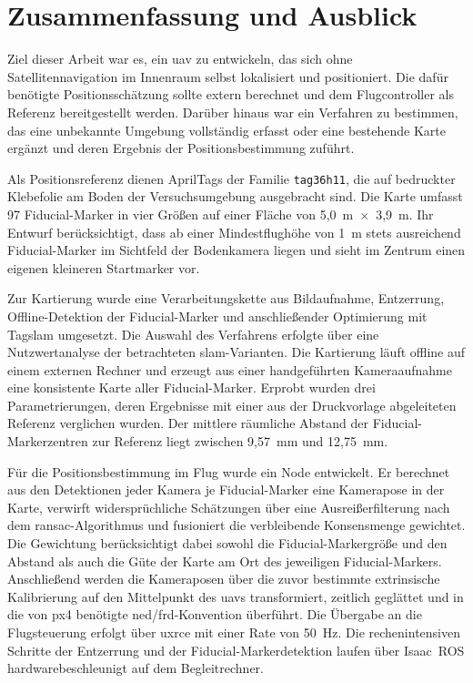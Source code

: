 
\chapter{Zusammenfassung und Ausblick}
\label{cap:zusammenfassung}
Ziel dieser Arbeit war es, ein \gls{uav} zu entwickeln, das sich ohne Satellitennavigation im Innenraum selbst lokalisiert und positioniert.
Die dafür benötigte Positionsschätzung sollte extern berechnet und dem Flugcontroller als Referenz bereitgestellt werden.
Darüber hinaus war ein Verfahren zu bestimmen, das eine unbekannte Umgebung vollständig erfasst oder eine bestehende Karte 
ergänzt und deren Ergebnis der Positionsbestimmung zuführt.

Als Positionsreferenz dienen AprilTags der Familie \texttt{tag36h11}, die auf bedruckter Klebefolie am Boden der Versuchsumgebung ausgebracht sind.
Die Karte umfasst 97 Fiducial-Marker in vier Größen auf einer Fläche von 5,0~m~$\times$~3,9~m.
Ihr Entwurf berücksichtigt, dass ab einer Mindestflughöhe von 1~m stets ausreichend Fiducial-Marker im Sichtfeld der Bodenkamera liegen 
und sieht im Zentrum einen eigenen kleineren Startmarker vor.

Zur Kartierung wurde eine Verarbeitungskette aus Bildaufnahme, Entzerrung, Offline-Detektion der Fiducial-Marker und anschließender Optimierung mit Tag\gls{slam} umgesetzt.
Die Auswahl des Verfahrens erfolgte über eine Nutzwertanalyse der betrachteten \gls{slam}-Varianten.
Die Kartierung läuft offline auf einem externen Rechner und erzeugt aus einer handgeführten Kameraaufnahme eine konsistente Karte aller Fiducial-Marker.
Erprobt wurden drei Parametrierungen, deren Ergebnisse mit einer aus der Druckvorlage abgeleiteten Referenz verglichen wurden.
Der mittlere räumliche Abstand der Fiducial-Markerzentren zur Referenz liegt zwischen 9,57~mm und 12,75~mm.

Für die Positionsbestimmung im Flug wurde ein Node entwickelt.
Er berechnet aus den Detektionen jeder Kamera je Fiducial-Marker eine Kamerapose in der Karte, verwirft widersprüchliche Schätzungen über eine Ausreißerfilterung nach dem \gls{ransac}-Algorithmus und fusioniert die verbleibende Konsensmenge gewichtet.
Die Gewichtung berücksichtigt dabei sowohl die Fiducial-Markergröße und den Abstand als auch die Güte der Karte am Ort des jeweiligen Fiducial-Markers.
Anschließend werden die Kameraposen über die zuvor bestimmte extrinsische Kalibrierung auf den Mittelpunkt des \gls{uav}s transformiert, zeitlich geglättet und in die von \gls{px4} benötigte \gls{ned}/\gls{frd}-Konvention überführt.
Die Übergabe an die Flugsteuerung erfolgt über \gls{uxrce} mit einer Rate von 50~Hz.
Die rechenintensiven Schritte der Entzerrung und der Fiducial-Markerdetektion laufen über Isaac~ROS hardwarebeschleunigt auf dem Begleitrechner.

